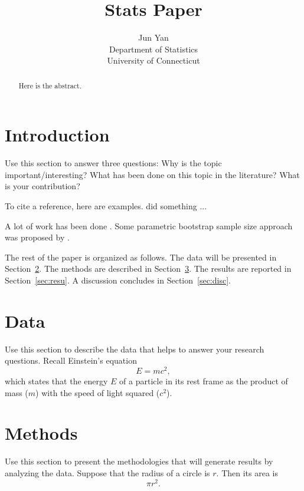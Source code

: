 \documentclass[12pt]{article}
\title{Stats Paper}
\author{Jun Yan\\
  Department of Statistics\\
  University of Connecticut
}
\begin{document}
\maketitle

\begin{abstract}
Here is the abstract.  
\end{abstract}

\doublespacing

\section{Introduction}
\label{sec:intro}

Use this section to answer three questions:
Why is the topic important/interesting?
What has been done on this topic in the literature?
What is your contribution?

\lipsum[1-3]

To cite a reference, here are examples.
\citet{xie2015dynamic} did something ... \lipsum[1]

A lot of work has been done \citep[e.g.,][]{xie2015dynamic}.
\lipsum[2]
Some parametric bootstrap sample size approach was proposed by
\citet{dwivedi2017analysis}. 


The rest of the paper is organized as follows.
The data will be presented in Section~\ref{sec:data}.
The methods are described in Section~\ref{sec:meth}.
The results are reported in Section~\ref{sec:resu}.
A discussion concludes in Section~\ref{sec:disc}.


\section{Data}
\label{sec:data}

Use this section to describe the data that helps to answer your research
questions. Recall Einstein's equation
\begin{equation}
  \label{eq:mc2}
  E = m c^2,
\end{equation}
which states that the energy $E$ of a particle in its rest frame as the product
of mass ($m$) with the speed of light squared ($c^2$).

\section{Methods}
\label{sec:meth}

Use this section to present the methodologies that will generate results by
analyzing the data. Suppose that the radius of a circle is $r$. Then its area is
\begin{equation}
  \label{eq:area}
  \pi r^2.
\end{equation}
\end{document}
